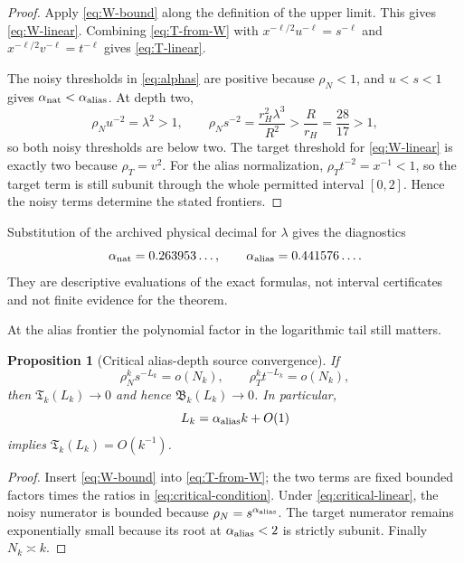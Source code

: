 \documentclass[11pt]{article}
\newtheorem{proposition}[theorem]{Proposition}
\theoremstyle{remark}
\begin{document}
\begin{proof}
Apply \eqref{eq:W-bound} along the definition of the upper limit.  This gives
\eqref{eq:W-linear}.  Combining \eqref{eq:T-from-W} with
$x^{-\ell/2}u^{-\ell}=s^{-\ell}$ and
$x^{-\ell/2}v^{-\ell}=t^{-\ell}$ gives \eqref{eq:T-linear}.

The noisy thresholds in \eqref{eq:alphas} are positive because
$\rho_N<1$, and $u<s<1$ gives
$\alpha_{\rm nat}<\alpha_{\rm alias}$.  At depth two,
\[
 \rho_Nu^{-2}=\lambda^2>1,
 \qquad
 \rho_Ns^{-2}=\frac{r_H^2\lambda^3}{R^2}
 >\frac{R}{r_H}=\frac{28}{17}>1,
\]
so both noisy thresholds are below two.  The target threshold for
\eqref{eq:W-linear} is exactly two because $\rho_T=v^2$.  For the alias
normalization, $\rho_Tt^{-2}=x^{-1}<1$, so the target term is still subunit
through the whole permitted interval $[0,2]$.  Hence the noisy terms determine
the stated frontiers.
\end{proof}

Substitution of the archived physical decimal for $\lambda$ gives the
diagnostics
\[
 \alpha_{\rm nat}=0.263953\ldots,
 \qquad \alpha_{\rm alias}=0.441576\ldots.
\]
They are descriptive evaluations of the exact formulas, not interval
certificates and not finite evidence for the theorem.

At the alias frontier the polynomial factor in the logarithmic tail still
matters.

\begin{proposition}[Critical alias-depth source convergence]
\label{prop:critical}
If
\begin{equation}\label{eq:critical-condition}
 \rho_N^ks^{-L_k}=o(N_k),
 \qquad \rho_T^kt^{-L_k}=o(N_k),
\end{equation}
then $\mathfrak T_k(L_k)\to0$ and hence
$\mathfrak B_k(L_k)\to0$.  In particular,
\begin{equation}\label{eq:critical-linear}
 L_k=\alpha_{\rm alias}k+O(1)
\end{equation}
implies $\mathfrak T_k(L_k)=O(k^{-1})$.
\end{proposition}

\begin{proof}
Insert \eqref{eq:W-bound} into \eqref{eq:T-from-W}; the two terms are fixed
bounded factors times the ratios in \eqref{eq:critical-condition}.  Under
\eqref{eq:critical-linear}, the noisy numerator is bounded because
$\rho_N=s^{\alpha_{\rm alias}}$.  The target numerator remains exponentially
small because its root at $\alpha_{\rm alias}<2$ is strictly subunit.
Finally $N_k\asymp k$.
\end{proof}
\end{document}
